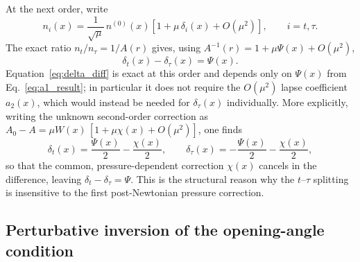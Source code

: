 \documentclass[
  aps,
  prd,
  twocolumn,
  nofootinbib,
  superscriptaddress,
  longbibliography
]{revtex4-2}
\begin{document}
At the next order, write
\begin{equation}
n_i(x)
=
\frac{1}{\sqrt{\mu}}\,n^{(0)}(x)
\left[1+\mu\,\delta_i(x)+O(\mu^2)\right],
\qquad i=t,\tau.
\label{eq:ni_expansion}
\end{equation}
The exact ratio $n_t/n_\tau=1/A(r)$ gives, using
$A^{-1}(r)=1+\mu\Psi(x)+O(\mu^2)$,
\begin{equation}
\delta_t(x)-\delta_\tau(x)=\Psi(x).
\label{eq:delta_diff}
\end{equation}
Equation~\eqref{eq:delta_diff} is exact at this order and depends only
on $\Psi(x)$ from Eq.~\eqref{eq:a1_result}; in particular it does not
require the $O(\mu^2)$ lapse coefficient $a_2(x)$, which would instead
be needed for $\delta_\tau(x)$ individually. More explicitly, writing
the unknown second-order correction as
$A_0-A=\mu W(x)\,[1+\mu\chi(x)+O(\mu^2)]$, one finds
\begin{equation}
\delta_t(x)=\frac{\Psi(x)}{2}-\frac{\chi(x)}{2},
\qquad
\delta_\tau(x)=-\frac{\Psi(x)}{2}-\frac{\chi(x)}{2},
\label{eq:delta_chi}
\end{equation}
so that the common, pressure-dependent correction $\chi(x)$ cancels in
the difference, leaving $\delta_t-\delta_\tau=\Psi$. This is the
structural reason why the $t$--$\tau$ splitting is insensitive to the
first post-Newtonian pressure correction.

\subsection{Perturbative inversion of the opening-angle condition}
\end{document}
